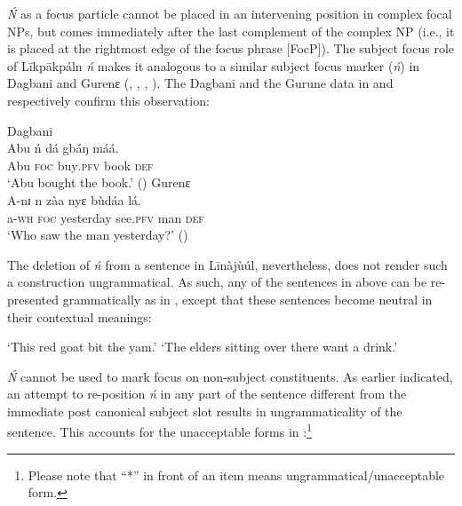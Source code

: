 \documentclass[output=paper,colorlinks,citecolor=brown]{langscibook}
\begin{document}
\textit{Ń} as a focus particle cannot be placed in an intervening position in complex focal NPs, but comes immediately after the last complement of the complex NP (i.e., it is placed at the rightmost edge of the focus phrase [FocP]). The subject focus role of Līkpākpáln \textit{ń} makes it analogous to a similar subject focus marker (\textit{ń}) in Dagbani and Gurenɛ (\citealt[4]{Dakubu2003}, \citealt[169]{Issah2013Focus}, \citealt[5]{IssahSmith2018}, \citealt[169]{Akrofi-Ansah2014}). The Dagbani and the Gurune data in  and  respectively confirm this observation:

\ea%
    \label{ex:bisilki:10}
    \ea\label{ex:bisilki:10a}
    Dagbani\\
    \gll    Abu	ń	dá		gbáŋ	máá.\\
            Abu	\textsc{foc}	buy\textsc{.pfv}	book	\textsc{def}\\
    \glt    ‘Abu bought the book.’ \hfill (\citealt[5]{IssahSmith2018})
    \ex\label{ex:bisilki:10b}
    Gurenɛ\\
    \gll    A-nɪ	n	zàa		nyɛ		bùdáa	lá.\\
            a\textsc{-wh}	\textsc{foc}	yesterday	see\textsc{.pfv}	man	\textsc{def}\\
    \glt    ‘Who saw the man yesterday?’ \hfill (\citealt[4]{Dakubu2003})
    \z
\z

The deletion of \textit{ń} from a sentence in Līnàjùúl, nevertheless, does not render such a construction ungrammatical. As such, any of the sentences in  above can be re-presented grammatically as in , except that these sentences become neutral in their contextual meanings:

\ea%
    \label{ex:bisilki:11}
    \jambox*{[neutral]}
    \glt    ‘This red goat bit the yam.’
    \jambox*{[neutral]}
    \glt    ‘The elders sitting over there want a drink.’
    \z
\z

\textit{Ń} cannot be used to mark focus on non-subject constituents. As earlier indicated, an attempt to re-position \textit{ń} in any part of the sentence different from the immediate post canonical subject slot results in ungrammaticality of the sentence. This accounts for the unacceptable forms in :\footnote{Please note that ``*'' in front of an item means ungrammatical/unacceptable form.}
\end{document}
